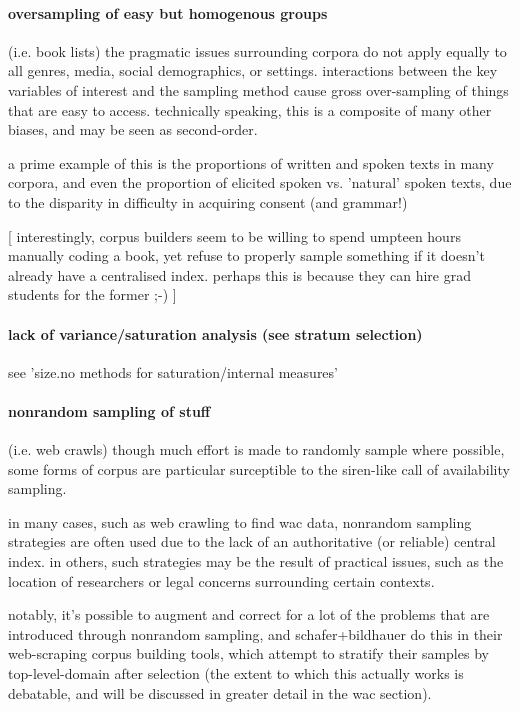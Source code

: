 \paragraph{ oversampling of easy but homogenous groups }
(i.e. book lists)
the pragmatic issues surrounding corpora do not apply equally to all genres, media, social demographics, or settings.  interactions between the key variables of interest and the sampling method cause gross over-sampling of things that are easy to access.  technically speaking, this is a composite of many other biases, and may be seen as second-order.

a prime example of this is the proportions of written and spoken texts in many corpora, and even the proportion of elicited spoken vs. 'natural' spoken texts, due to the disparity in difficulty in acquiring consent (and grammar!)

[ interestingly, corpus builders seem to be willing to spend umpteen hours manually coding a book, yet refuse to properly sample something if it doesn't already have a centralised index.  perhaps this is because they can hire grad students for the former ;-) ]


\paragraph{ lack of variance/saturation analysis (see stratum selection)}
see 'size.no methods for saturation/internal measures'


\paragraph{ nonrandom sampling of stuff }
(i.e. web crawls)
though much effort is made to randomly sample where possible, some forms of corpus are particular surceptible to the siren-like call of availability sampling.

in many cases, such as web crawling to find wac data, nonrandom sampling strategies are often used due to the lack of an authoritative (or reliable) central index.  in others, such strategies may be the result of practical issues, such as the location of researchers or legal concerns surrounding certain contexts.

notably, it's possible to augment and correct for a lot of the problems that are introduced through nonrandom sampling, and schafer+bildhauer do this in their web-scraping corpus building tools, which attempt to stratify their samples by top-level-domain after selection (the extent to which this actually works is debatable, and will be discussed in greater detail in the wac section).

